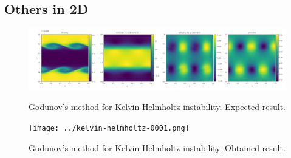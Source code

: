 \clearpage
\subsection{Others in 2D}

\begin{figure}[htbp]
    \centering
	\includegraphics[width=.9\textwidth]{./figures/kelvin-helmholtz-0001.png}%
	\caption{Godunov's method for Kelvin Helmholtz instability. Expected result.}
	\texttt{[image: ../kelvin-helmholtz-0001.png]}%
	\caption{Godunov's method for Kelvin Helmholtz instability. Obtained result.}
\end{figure}





